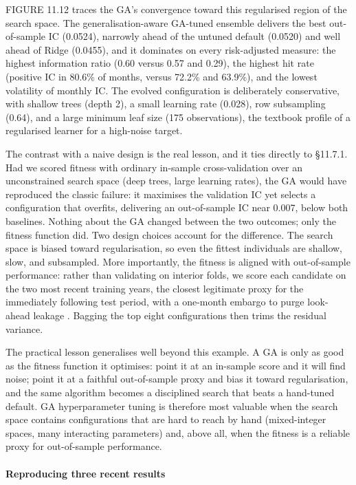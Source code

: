 FIGURE 11.12 traces the GA's convergence toward this regularised region of the search space. The generalisation-aware GA-tuned ensemble delivers the best out-of-sample IC (0.0524), narrowly ahead of the untuned default (0.0520) and well ahead of Ridge (0.0455), and it dominates on every risk-adjusted measure: the highest information ratio (0.60 versus 0.57 and 0.29), the highest hit rate (positive IC in 80.6\% of months, versus 72.2\% and 63.9\%), and the lowest volatility of monthly IC. The evolved configuration is deliberately conservative, with shallow trees (depth 2), a small learning rate (0.028), row subsampling (0.64), and a large minimum leaf size (175 observations), the textbook profile of a regularised learner for a high-noise target.

The contrast with a naive design is the real lesson, and it ties directly to §11.7.1. Had we scored fitness with ordinary in-sample cross-validation over an unconstrained search space (deep trees, large learning rates), the GA would have reproduced the classic failure: it maximises the validation IC yet selects a configuration that overfits, delivering an out-of-sample IC near 0.007, below both baselines. Nothing about the GA changed between the two outcomes; only the fitness function did. Two design choices account for the difference. The search space is biased toward regularisation, so even the fittest individuals are shallow, slow, and subsampled. More importantly, the fitness is aligned with out-of-sample performance: rather than validating on interior folds, we score each candidate on the two most recent training years, the closest legitimate proxy for the immediately following test period, with a one-month embargo to purge look-ahead leakage \citep{Arian2024}. Bagging the top eight configurations then trims the residual variance.

The practical lesson generalises well beyond this example. A GA is only as good as the fitness function it optimises: point it at an in-sample score and it will find noise; point it at a faithful out-of-sample proxy and bias it toward regularisation, and the same algorithm becomes a disciplined search that beats a hand-tuned default. GA hyperparameter tuning is therefore most valuable when the search space contains configurations that are hard to reach by hand (mixed-integer spaces, many interacting parameters) and, above all, when the fitness is a reliable proxy for out-of-sample performance.

\paragraph{Reproducing three recent results}

